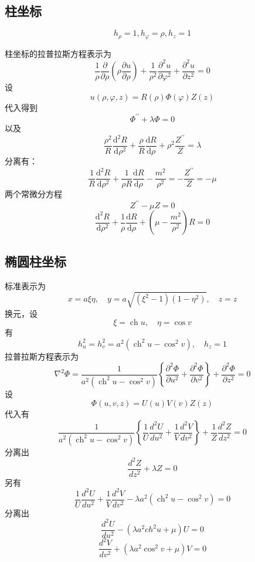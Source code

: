 \documentclass[a4paper]{ctexart}
\begin{document}
\subsection{柱坐标}

$$
    h_{\rho}=1,h_{\varphi}=\rho ,h_z=1
$$

柱坐标的拉普拉斯方程表示为
\[
    \frac{1}{\rho} \frac{\partial}{\partial \rho}\left(\rho \frac{\partial u}{\partial \rho}\right)+\frac{1}{\rho^{2}} \frac{\partial^{2} u}{\partial \varphi^{2}}+\frac{\partial^{2} u}{\partial z^{2}}=0
\]
设
\[
    u(\rho, \varphi, z)=R(\rho) \Phi(\varphi) Z(z)
\]
代入得到
\begin{equation}
    \Phi^{\prime \prime}+\lambda \Phi=0
\end{equation}
以及
\[
    \frac{\rho^{2}}{R} \frac{\mathrm{d}^{2} R}{\mathrm{d} \rho^{2}}+\frac{\rho}{R} \frac{\mathrm{d} R}{\mathrm{d} \rho}+\rho^{2} \frac{Z^{\prime \prime}}{Z}=\lambda
\]
分离有：
\[
    \frac{1}{R} \frac{\mathrm{d}^{2} R}{\mathrm{d} \rho^{2}}+\frac{1}{\rho R} \frac{\mathrm{d} R}{\mathrm{d} \rho}-\frac{m^{2}}{\rho^{2}}=-\frac{Z^{\prime \prime}}{Z}=-\mu
\]
两个常微分方程
\begin{equation}
    Z^{\prime \prime}-\mu Z=0
\end{equation}
\begin{equation}
    \frac{\mathrm{d}^{2} R}{\mathrm{d} \rho^{2}}+\frac{1}{\rho} \frac{\mathrm{d} R}{\mathrm{d} \rho}+\left(\mu-\frac{m^{2}}{\rho^{2}}\right) R=0
\end{equation}
\subsection{椭圆柱坐标}
标准表示为
$$
    x=a \xi \eta, \quad y=a \sqrt{\left(\xi^{2}-1\right)\left(1-\eta^{2}\right)}, \quad z=z
$$
换元，设
$$\xi=\operatorname{ch} u, \quad \eta=\cos v$$
有
$$
    h_{u}^{2}=h_{v}^{2}=a^{2}\left(\operatorname{ch}^{2} u-\cos ^{2} v\right), \quad h_{z}=1
$$
拉普拉斯方程表示为
$$
    \nabla^{2} \Phi=\frac{1}{a^{2}\left(\operatorname{ch}^{2} u-\cos ^{2} v\right)}\left\{\frac{\partial^{2} \Phi}{\partial u^{2}}+\frac{\partial^{2} \Phi}{\partial v^{2}}\right\}+\frac{\partial^{2} \Phi}{\partial z^{2}}=0
$$
设
$$
    \Phi \left( u,v,z \right) =U\left( u \right) V\left( v \right) Z\left( z \right)
$$
代入有
$$
    \frac{1}{a^2\left( \operatorname{ch}^2u-\cos ^2v \right)}\left\{ \frac{1}{U}\frac{d^2U}{du^2}+\frac{1}{V}\frac{d^2V}{dv^2} \right\} +\frac{1}{Z}\frac{d^2Z}{dz^2}=0
$$
分离出
\begin{equation}
    \frac{d^2Z}{dz^2}+\lambda Z=0
\end{equation}
另有
$$
    \frac{1}{U}\frac{d^2U}{du^2}+\frac{1}{V}\frac{d^2V}{dv^2}-\lambda a^2\left( \operatorname{ch}^2u-\cos ^2v \right) = 0
$$
分离出
\begin{equation}
    \frac{d^2U}{du^2}-\left( \lambda a^2ch^2u+\mu \right) U=0
\end{equation}
\begin{equation}
    \frac{d^2V}{dv^2}+\left( \lambda a^2\cos ^2v+\mu \right) V=0
\end{equation}
\end{document}
